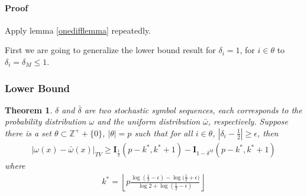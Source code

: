 \documentclass{article}
\newtheorem{theorem}{Theorem}
\begin{document}
\paragraph{Proof} Apply lemma \ref{onedifflemma} repeatedly. 


First we are going to generalize the lower bound result for $\delta_i=1$, for $i\in \theta$ to $\delta_i=\delta_M \le 1$. 

\subsubsection{Lower Bound}
\begin{theorem}
$\delta$ and $\bar{\delta}$ are two stochastic symbol sequences, each corresponds to the probability distribution $\omega$ and the uniform distribution $\bar{\omega}$, respectively. Suppose there is a set $\theta \subset \mathbb{Z}^++\{0\} $, $|\theta|=p$ such that for all $i \in \theta$, $|\delta_i-\frac{1}{2}| \ge \epsilon$, then
\begin{eqnarray}
|\omega(x)-\bar{\omega}(x)|_{TV} \ge \mathbf{I}_{\frac{1}{2}}(p-k^*,k^*+1) - \mathbf{I}_{1-\delta^M}(p-k^*,k^*+1)
\end{eqnarray}  
where 
\begin{eqnarray}
k^* =  \left\lfloor p \frac{\log{(\frac{1}{2}-\epsilon)}-\log{(\frac{1}{2}+\epsilon})}{\log{2}+\log{(\frac{1}{2}-\epsilon)} }  \right\rfloor
\end{eqnarray}
\end{theorem}
\end{document}
